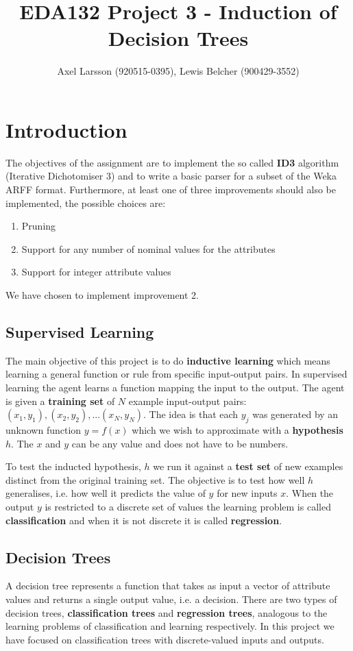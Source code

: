 \documentclass{article}
\title{EDA132 Project 3 - Induction of Decision Trees}
\author{Axel Larsson (920515-0395), Lewis Belcher (900429-3552)}
\date{}
\begin{document}
\maketitle

\section{Introduction}
The objectives of the assignment are to implement the so called \textbf{ID3}\cite{quinlan} algorithm (Iterative Dichotomiser 3) and to write a basic parser for a subset of the Weka ARFF format\cite{weka}. Furthermore, at least one of three improvements should also be implemented, the possible choices are:
\begin{enumerate}
    \item Pruning
    \item Support for any number of nominal values for the attributes
    \item Support for integer attribute values
\end{enumerate}
We have chosen to implement improvement 2.

\subsection{Supervised Learning}
The main objective of this project is to do \textbf{inductive learning} which means learning a general function or rule from specific input-output pairs. In supervised learning the agent learns a function mapping the input to the output. The agent is given a \textbf{training set} of $N$ example input-output pairs: $(x_1,y_1), (x_2,y_2),...(x_N,y_N)$. The idea is that each $y_j$ was generated by an unknown function $y=f(x)$ which we wish to approximate with a \textbf{hypothesis} $h$. The $x$ and $y$ can be any value and does not have to be numbers.

To test the inducted hypothesis, $h$ we run it against a \textbf{test set} of new examples distinct from the original training set. The objective is to test how well $h$ generalises, i.e. how well it predicts the value of $y$ for new inputs $x$. When the output $y$ is restricted to a discrete set of values the learning problem is called \textbf{classification} and when it is not discrete it is called \textbf{regression}.

\subsection{Decision Trees}
A decision tree represents a function that takes as input a vector of attribute values and returns a single output value, i.e. a decision. There are two types of decision trees, \textbf{classification trees} and \textbf{regression trees}, analogous to the learning problems of classification and learning respectively. In this project we have focused on classification trees with discrete-valued inputs and outputs.
\end{document}
